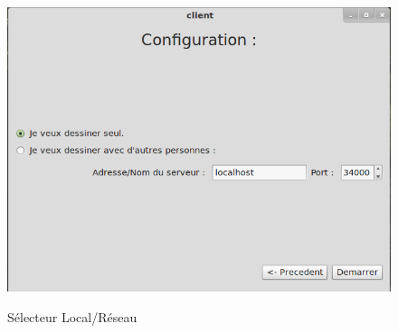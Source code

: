 \documentclass{report}
\begin{document}
				\newpage
				\begin{figure}[!h]
						\centering
						\includegraphics[scale=0.4]{../images/capture_choix.png}\\
						\caption{Sélecteur Local/Réseau}
						\label{Sélecteur Local/Réseau}
				\end{figure}
				\newpage
\end{document}
